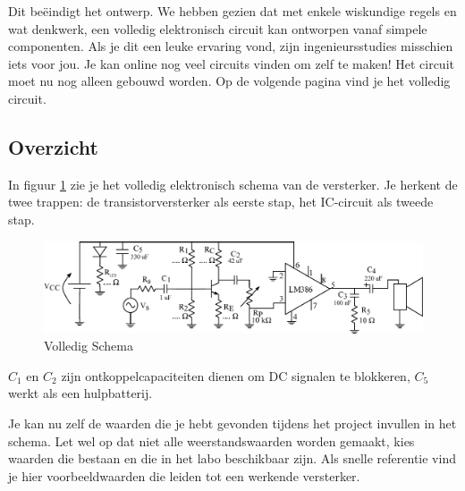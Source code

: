 \documentclass{article}
\begin{document}
			Dit be\"eindigt het ontwerp. We hebben gezien dat met enkele wiskundige regels en wat denkwerk, een volledig elektronisch circuit kan ontworpen vanaf simpele componenten. Als je dit een leuke ervaring vond, zijn ingenieursstudies misschien iets voor jou. Je kan online nog veel circuits vinden om zelf te maken!
			Het circuit moet nu nog alleen gebouwd worden. Op de volgende pagina vind je het volledig circuit. 
\begin{landscape}
	
\section{Overzicht}

		In figuur \ref{fig:volledig_schema} zie je het volledig elektronisch schema van de versterker. Je herkent de twee trappen: de transistorversterker als eerste stap, het IC-circuit als tweede stap. 
		\begin{figure}[htbp]
			\centering
			\includegraphics[width=\linewidth]{volledig_schema}
			\caption{Volledig Schema}
			\label{fig:volledig_schema}
		\end{figure}
		$C_1$ en $C_2$ zijn ontkoppelcapaciteiten dienen om DC signalen te blokkeren, $C_5$ werkt als een hulpbatterij.

		Je kan nu zelf de waarden die je hebt gevonden tijdens het project invullen in het schema. Let wel op dat niet alle weerstandswaarden worden gemaakt, kies waarden die bestaan en die in het labo beschikbaar zijn.
		Als snelle referentie vind je hier voorbeeldwaarden die leiden tot een werkende versterker.

		\begin{center}
			\noindent {}
		\end{center}

\end{landscape}
	
\end{document}
